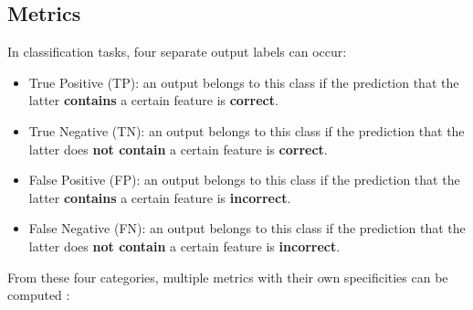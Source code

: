 \subsection{Metrics}
In classification tasks, four separate output labels can occur:
\begin{itemize}
\item True Positive (TP):  an output belongs to this class if the prediction that the latter \textbf{contains} a certain feature is \textbf{correct}.
\item True Negative (TN): an output belongs to this class if the prediction that the latter does \textbf{not contain} a certain feature is \textbf{correct}.
\item False Positive (FP): an output belongs to this class if the prediction that the latter \textbf{contains} a certain feature is \textbf{incorrect}.
\item False Negative (FN): an output belongs to this class if the prediction that the latter does \textbf{not contain} a certain feature is \textbf{incorrect}.
\end{itemize}
From these four categories, multiple metrics with their own specificities can be computed \cite{25}:
